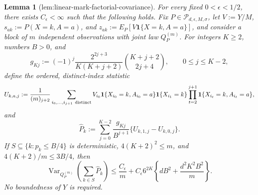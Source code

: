 \documentclass{article}
\newtheorem{lemma}{Lemma}
\begin{document}
\begin{lemma}[lem:linear-mark-factorial-covariance]\label{lem:linear-mark-factorial-covariance}
For every fixed \(0<\epsilon<1/2\), there exists \(C_{\epsilon}<\infty\) such that the following holds.  Fix \(P\in\mathcal P_{d,\epsilon,M,\sigma}\), let \(V:=Y/M\), \(s_{ak}:=P(X=k,A=a)\), and \(z_{ak}:=E_P[V\mathbf 1\{X=k,A=a\}]\), and consider a block of \(m\) independent observations with joint law \(Q_P^{(m)}\).  For integers \(K\ge2\), numbers \(B>0\), and
\[
 g_{Kj}:=(-1)^j\frac{2^{2j+3}}{K(K+j+2)}\binom{K+j+2}{2j+4},\qquad 0\le j\le K-2,
\]
define the ordered, distinct-index statistic
\[
 U_{k,a,j}:=\frac{1}{(m)_{j+2}}
 \sum_{i_0,\ldots,i_{j+1}\ {\rm distinct}}
 V_{i_0}\mathbf 1\{X_{i_0}=k,A_{i_0}=a\}
 \mathbf 1\{X_{i_1}=k\}
 \prod_{t=2}^{j+1}\mathbf 1\{X_{i_t}=k,A_{i_t}=a\},
\]
and
\[
 \widehat P_k:=\sum_{j=0}^{K-2}\frac{g_{Kj}}{B^{j+1}}
 \{U_{k,1,j}-U_{k,0,j}\}.
\]
If \(S\subseteq\{k:p_k\le B/4\}\) is deterministic, \(4(K+2)^2\le m\), and \(4(K+2)/m\le3B/4\), then
\[
 \operatorname{Var}_{Q_P^{(m)}}\!\left(\sum_{k\in S}\widehat P_k\right)
 \le \frac{C_{\epsilon}}m+C_{\epsilon}6^{2K}
 \left\{dB^2+\frac{d^2K^2B^2}{m}\right\}.
\]
No boundedness of \(Y\) is required.
\end{lemma}
\end{document}
